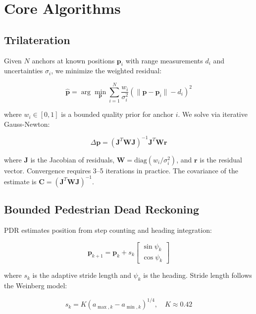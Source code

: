 \documentclass[12pt,a4paper]{article}
\begin{document}
\section{Core Algorithms}

\subsection{Trilateration}

Given $N$ anchors at known positions $\mathbf{p}_i$ with range measurements $d_i$ and uncertainties $\sigma_i$, we minimize the weighted residual:

\begin{equation}
\hat{\mathbf{p}} = \arg\min_{\mathbf{p}} \sum_{i=1}^{N} \frac{w_i}{\sigma_i^2} \left( \|\mathbf{p} - \mathbf{p}_i\| - d_i \right)^2
\end{equation}

where $w_i \in [0,1]$ is a bounded quality prior for anchor $i$. We solve via iterative Gauss-Newton:

\begin{equation}
\Delta\mathbf{p} = (\mathbf{J}^T \mathbf{W} \mathbf{J})^{-1} \mathbf{J}^T \mathbf{W} \mathbf{r}
\end{equation}

where $\mathbf{J}$ is the Jacobian of residuals, $\mathbf{W} = \text{diag}(w_i/\sigma_i^2)$, and $\mathbf{r}$ is the residual vector. Convergence requires 3--5 iterations in practice. The covariance of the estimate is $\mathbf{C} = (\mathbf{J}^T \mathbf{W} \mathbf{J})^{-1}$.

\subsection{Bounded Pedestrian Dead Reckoning}

PDR estimates position from step counting and heading integration:

\begin{equation}
\mathbf{p}_{k+1} = \mathbf{p}_k + s_k \begin{bmatrix} \sin\psi_k \\ \cos\psi_k \end{bmatrix}
\end{equation}

where $s_k$ is the adaptive stride length and $\psi_k$ is the heading. Stride length follows the Weinberg model:

\begin{equation}
s_k = K (a_{\max,k} - a_{\min,k})^{1/4}, \quad K \approx 0.42
\end{equation}
\end{document}
